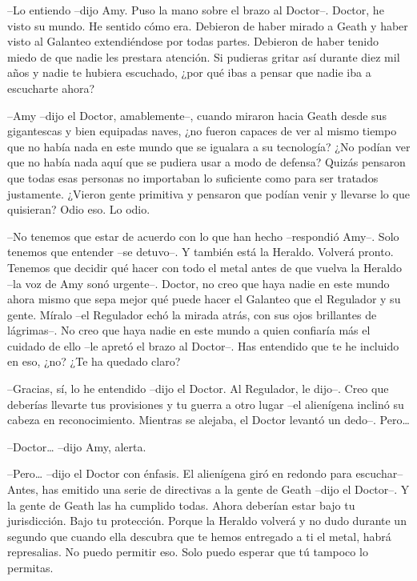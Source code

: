 {--Lo entiendo --dijo Amy. Puso la mano sobre el brazo al Doctor--.
	Doctor, he visto su mundo. He sentido cómo era. Debieron de haber mirado
	a Geath y haber visto al Galanteo extendiéndose por todas partes.
	Debieron de haber tenido miedo de que nadie les prestara atención. Si
	pudieras gritar así durante diez mil años y nadie te hubiera escuchado,
¿por qué ibas a pensar que nadie iba a escucharte ahora?}

{--Amy --dijo el Doctor, amablemente--, cuando miraron hacia Geath
	desde sus gigantescas y bien equipadas naves, ¿no fueron capaces de ver
	al mismo tiempo que no había nada en este mundo que se igualara a su
	tecnología? ¿No podían ver que no había nada aquí que se pudiera usar a
	modo de defensa? Quizás pensaron que todas esas personas no importaban
	lo suficiente como para ser tratados justamente. ¿Vieron gente primitiva
	y pensaron que podían venir y llevarse lo que quisieran? Odio eso. Lo
odio.}

{--No tenemos que estar de acuerdo con lo que han hecho --respondió
	Amy--. Solo tenemos que entender --se detuvo--. Y también está la
	Heraldo. Volverá pronto. Tenemos que decidir qué hacer con todo el metal
	antes de que vuelva la Heraldo --la voz de Amy sonó urgente--. Doctor,
	no creo que haya nadie en este mundo ahora mismo que sepa mejor qué
	puede hacer el Galanteo que el Regulador y su gente. Míralo --el
	Regulador echó la mirada atrás, con sus ojos brillantes de lágrimas--.
	No creo que haya nadie en este mundo a quien confiaría más el cuidado de
	ello --le apretó el brazo al Doctor--. Has entendido que te he incluido
en eso, ¿no? ¿Te ha quedado claro?}

{--Gracias, sí, lo he entendido --dijo el Doctor. Al Regulador, le
	dijo--. Creo que deberías llevarte tus provisiones y tu guerra a otro
	lugar --el alienígena inclinó su cabeza en reconocimiento. Mientras se
	alejaba, el Doctor levantó un dedo--. Pero\ldots{}}

{--Doctor\ldots{} --dijo Amy, alerta.}

{--Pero\ldots{} --dijo el Doctor con énfasis. El alienígena giró en
	redondo para escuchar-- Antes, has emitido una serie de directivas a la
	gente de Geath --dijo el Doctor--. Y la gente de Geath las ha cumplido
	todas. Ahora deberían estar bajo tu jurisdicción. Bajo tu protección.
	Porque la Heraldo volverá y no dudo durante un segundo que cuando ella
	descubra que te hemos entregado a ti el metal, habrá represalias. No
puedo permitir eso. Solo puedo esperar que tú tampoco lo permitas.}

